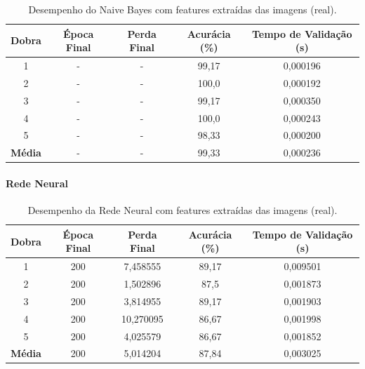 \begin{table}[H]
\caption{Desempenho do Naive Bayes com features extraídas das imagens (real).}
\centering
\begin{tabular}{ccccc}
\hline
\textbf{Dobra} & \textbf{Época Final} & \textbf{Perda Final} & \textbf{Acurácia (\%)} & \textbf{Tempo de Validação (s)}  \\
\hline
1 & - & - & 99,17 & 0,000196 \\
2 & - & - & 100,0 & 0,000192 \\
3 & - & - & 99,17 & 0,000350 \\
4 & - & - & 100,0 & 0,000243 \\
5 & - & - & 98,33 & 0,000200 \\
\hline
\textbf{Média} & - & - & 99,33 & 0,000236 \\
\hline
\end{tabular}
\fonte{}
\label{tab:naive_features_imagens}
\end{table}


\paragraph{Rede Neural}

\begin{table}[H]
\caption{Desempenho da Rede Neural com features extraídas das imagens (real).}
\centering
\begin{tabular}{ccccc}
\hline
\textbf{Dobra} & \textbf{Época Final} & \textbf{Perda Final} & \textbf{Acurácia (\%)} & \textbf{Tempo de Validação (s)}  \\
\hline
1 & 200 & 7,458555 & 89,17 & 0,009501 \\
2 & 200 & 1,502896 & 87,5 & 0,001873 \\
3 & 200 & 3,814955 & 89,17 & 0,001903 \\
4 & 200 & 10,270095 & 86,67 & 0,001998 \\
5 & 200 & 4,025579 & 86,67 & 0,001852 \\
\hline
\textbf{Média} & 200 & 5,014204 & 87,84 & 0,003025 \\
\hline
\end{tabular}
\fonte{}
\label{tab:rn_features_imagens_real}
\end{table}

